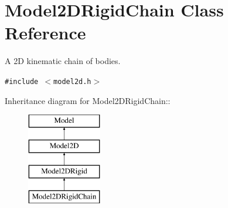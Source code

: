 \section{Model2DRigid\-Chain  Class Reference}
\label{class_Model2DRigidChain}
A 2D kinematic chain of bodies. 


{\tt \#include $<$model2d.h$>$}

Inheritance diagram for Model2DRigid\-Chain::\begin{figure}[H]
\begin{center}
\leavevmode
\includegraphics[height=4cm]{class_Model2DRigidChain}
\end{center}
\end{figure}
